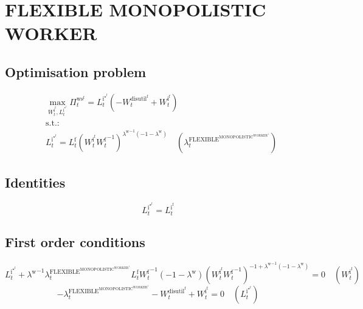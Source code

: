 \section{FLEXIBLE MONOPOLISTIC WORKER}

\subsection{Optimisation problem}

\begin{align}
&\max_{W^{\mathrm{i}^{\mathrm{f}}}_{t}, L^{\mathrm{i}^{\star^{\mathrm{f}}}}_{t}
} \Pi^{\mathrm{ws}^{\mathrm{f}}}_{t} = {L^{\mathrm{i}^{\star^{\mathrm{f}}}}_{t}} \left(-W^{\mathrm{disutil}^{\mathrm{f}}}_{t} + W^{\mathrm{i}^{\mathrm{f}}}_{t}\right)\\
&\mathrm{s.t.:}\nonumber\\
& L^{\mathrm{i}^{\star^{\mathrm{f}}}}_{t} = {L^{\mathrm{f}}_{t}} {\left({W^{\mathrm{i}^{\mathrm{f}}}_{t}} {W^{\mathrm{f}}_{t}}^{-1}\right)^{{\lambda^{\mathrm{w}}}^{-1} \left(-1 - \lambda^{\mathrm{w}}\right)}} \quad \left(\lambda^{\mathrm{FLEXIBLE}^{\mathrm{MONOPOLISTIC}^{\mathrm{WORKER}^{\mathrm{1}}}}}_{t}\right)
\end{align}


\subsection{Identities}

\begin{equation}
L^{\mathrm{i}^{\star^{\mathrm{f}}}}_{t} = L^{\mathrm{i}^{\mathrm{f}}}_{t}
\end{equation}


\subsection{First order conditions}

\begin{equation}
L^{\mathrm{i}^{\star^{\mathrm{f}}}}_{t} + {\lambda^{\mathrm{w}}}^{-1} {\lambda^{\mathrm{FLEXIBLE}^{\mathrm{MONOPOLISTIC}^{\mathrm{WORKER}^{\mathrm{1}}}}}_{t}} {L^{\mathrm{f}}_{t}} {W^{\mathrm{f}}_{t}}^{-1} \left(-1 - \lambda^{\mathrm{w}}\right) {\left({W^{\mathrm{i}^{\mathrm{f}}}_{t}} {W^{\mathrm{f}}_{t}}^{-1}\right)^{-1 + {\lambda^{\mathrm{w}}}^{-1} \left(-1 - \lambda^{\mathrm{w}}\right)}} = 0
 \quad \left(W^{\mathrm{i}^{\mathrm{f}}}_{t}\right)
\end{equation}
\begin{equation}
-\lambda^{\mathrm{FLEXIBLE}^{\mathrm{MONOPOLISTIC}^{\mathrm{WORKER}^{\mathrm{1}}}}}_{t} - W^{\mathrm{disutil}^{\mathrm{f}}}_{t} + W^{\mathrm{i}^{\mathrm{f}}}_{t} = 0
 \quad \left(L^{\mathrm{i}^{\star^{\mathrm{f}}}}_{t}\right)
\end{equation}


